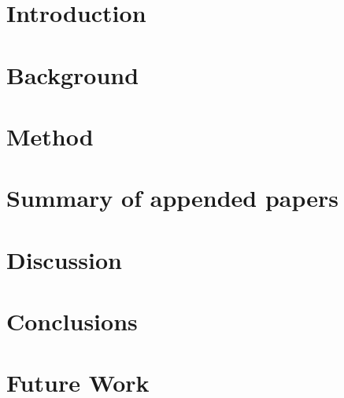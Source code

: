 \documentclass[10pt,twoside]{book}
\begin{document}
\tableofcontents
\newpage
\clearpage{\pagestyle{empty}\cleardoublepage} %


\newpage
\clearpage{\pagestyle{empty}\cleardoublepage} %


\mainmatter
\chapter{Introduction}

\clearpage{\pagestyle{empty}\cleardoublepage} %

\chapter{Background}

\clearpage{\pagestyle{empty}\cleardoublepage} %

\chapter{Method}

\clearpage{\pagestyle{empty}\cleardoublepage} %

\chapter{Summary of appended papers}

\clearpage{\pagestyle{empty}\cleardoublepage} %

\chapter{Discussion}

\clearpage{\pagestyle{empty}\cleardoublepage} %

\chapter{Conclusions}

\clearpage{\pagestyle{empty}\cleardoublepage} %

\chapter{Future Work}

\clearpage{\pagestyle{empty}\cleardoublepage} %
\end{document}

